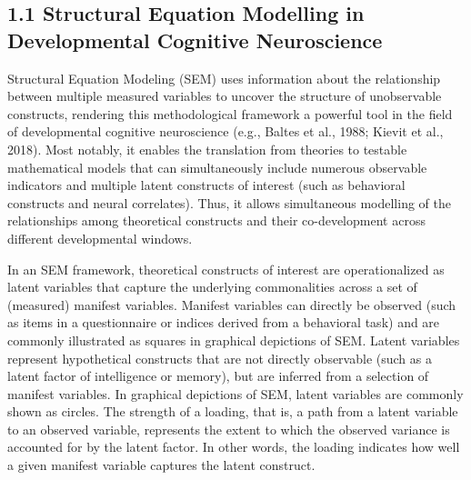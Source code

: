 \documentclass[
  man,floatsintext]{apa6}
\begin{document}
\hypertarget{structural-equation-modelling-in-developmental-cognitive-neuroscience}{%
\subsection{1.1 Structural Equation Modelling in Developmental Cognitive Neuroscience}\label{structural-equation-modelling-in-developmental-cognitive-neuroscience}}

Structural Equation Modeling (SEM) uses information about the relationship between multiple measured variables to uncover the structure of unobservable constructs, rendering this methodological framework a powerful tool in the field of developmental cognitive neuroscience (e.g., Baltes et al., 1988; Kievit et al., 2018). Most notably, it enables the translation from theories to testable mathematical models that can simultaneously include numerous observable indicators and multiple latent constructs of interest (such as behavioral constructs and neural correlates). Thus, it allows simultaneous modelling of the relationships among theoretical constructs and their co-development across different developmental windows.

In an SEM framework, theoretical constructs of interest are operationalized as latent variables that capture the underlying commonalities across a set of (measured) manifest variables. Manifest variables can directly be observed (such as items in a questionnaire or indices derived from a behavioral task) and are commonly illustrated as squares in graphical depictions of SEM. Latent variables represent hypothetical constructs that are not directly observable (such as a latent factor of intelligence or memory), but are inferred from a selection of manifest variables. In graphical depictions of SEM, latent variables are commonly shown as circles. The strength of a loading, that is, a path from a latent variable to an observed variable, represents the extent to which the observed variance is accounted for by the latent factor. In other words, the loading indicates how well a given manifest variable captures the latent construct.
\end{document}
